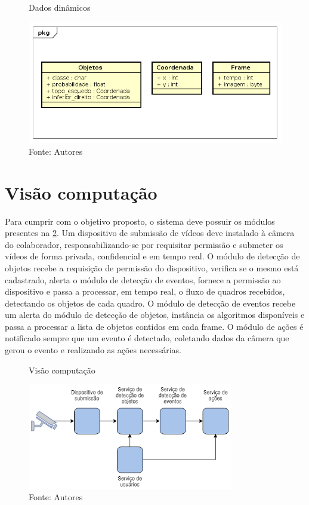 \documentclass[]{politex}
\begin{document}
\begin{figure}[H]
    \centering
    \caption{Dados dinâmicos}
    \includegraphics[width=\textwidth]{Visao_info_dinamico}
    \caption*{Fonte: Autores}
    \label{fig:visaoInfomacao_dinamico}
\end{figure}

\section{Visão computação}
Para cumprir com o objetivo proposto, o sistema deve possuir os módulos presentes na \ref{fig:visaoComputacao}. Um dispositivo de submissão de vídeos deve instalado à câmera do colaborador, responsabilizando-se por requisitar permissão e submeter os vídeos de forma privada, confidencial e em tempo real. O módulo de detecção de objetos recebe a requisição de permissão do dispositivo, verifica se o mesmo está cadastrado, alerta o módulo de detecção de eventos, fornece a permissão ao dispositivo e passa a processar, em tempo real, o fluxo de quadros recebidos, detectando os objetos de cada quadro. O módulo de detecção de eventos recebe um alerta do módulo de detecção de objetos, instância os algoritmos disponíveis e passa a processar a lista de objetos contidos em cada frame. O módulo de ações é notificado sempre que um evento é detectado, coletando dados da câmera que gerou o evento e realizando as ações necessárias.

\begin{figure}[H]
    \centering
    \caption{Visão computação}
    \includegraphics[width=0.8\textwidth]{Visao_Computacao}
    \caption*{Fonte: Autores}
    \label{fig:visaoComputacao}
\end{figure}
\end{document}
